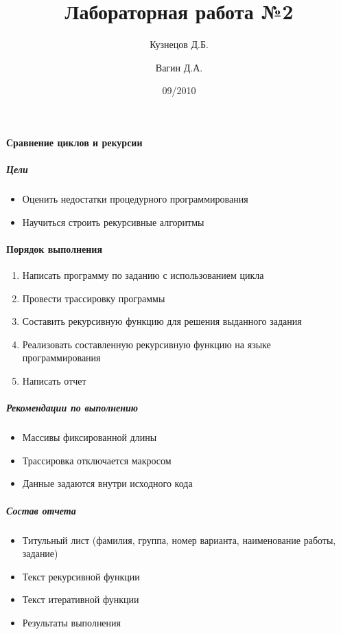 \documentclass[a4paper,12pt]{article}
\title{Лабораторная работа №2}
\author{Кузнецов Д.Б.\and Вагин Д.А.}
\date{09/2010}
\begin{document}
\paragraph{Сравнение циклов и рекурсии}
\subparagraph{Цели}
\begin{itemize}
	\item Оценить недостатки процедурного программирования
	\item Научиться строить рекурсивные алгоритмы
\end{itemize}

\paragraph{Порядок выполнения}
\begin{enumerate}
	\item Написать программу по заданию с использованием цикла
	\item Провести трассировку программы
	\item Составить рекурсивную функцию для решения выданного задания
	\item Реализовать составленную рекурсивную функцию на языке программирования
	\item Написать отчет
\end{enumerate}

\subparagraph{Рекомендации по выполнению}
\begin{itemize}
	\item Массивы фиксированной длины
	\item Трассировка отключается макросом
	\item Данные задаются внутри исходного кода
\end{itemize}

\subparagraph{Состав отчета}
\begin{itemize}
	\item Титульный лист (фамилия, группа, номер варианта, наименование работы, задание)
	\item Текст рекурсивной функции
	\item Текст итеративной функции
	\item Результаты выполнения
\end{itemize}
\end{document}
